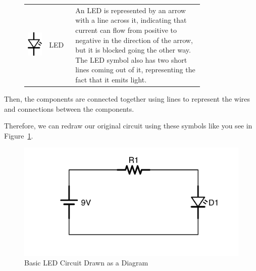 \begin{figure}
\begin{center}
\begin{tabular}{M{0.1\linewidth} | M{0.12\linewidth} | m{0.6\linewidth}}
\includegraphics[scale=0.125]{LEDSymbol.png} & LED & An LED is represented by an arrow with a line across it, indicating that current can flow from positive to negative in the direction of the arrow, but it is blocked going the other way.  The LED symbol also has two short lines coming out of it, representing the fact that it emits light. \\
\end{tabular}
\end{center}
\end{figure}

Then, the components are connected together using lines to represent the wires and connections between the components.

Therefore, we can redraw our original circuit using these symbols like you see in Figure~\ref{figCircuitBasicLED}.

\begin{figure}
\caption{Basic LED Circuit Drawn as a Diagram}
\label{figCircuitBasicLED}
\centering
\includegraphics[scale=0.125]{CircuitBasicLED.png}
\end{figure}

